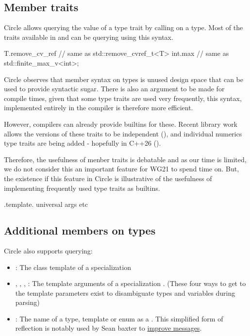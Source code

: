 \documentclass{wg21}
\begin{document}
\subsection{Member traits}
\label{sec:membertraits}

Circle allows querying the value of a type trait by calling \emph{} on a type.
Most of the traits available in  and  can be querying using this syntax.

\begin{colorblock}
T.remove_cv_ref  // same as std::remove_cvref_t<T>
int.max          // same as std::finite_max_v<int>;
\end{colorblock}

Circle observes that member syntax on types is unused design space that can be used to provide syntactic sugar.
There is also an argument to be made for compile times, given that some type traits are used very frequently,
this syntax, implemented entirely in the compiler is therefore more efficient.

However, compilers can already provide builtins for these.
Recent library work allows the  versions of these traits to be independent (),
and individual numerics type traits are being added - hopefully in C++26 ().

Therefore, the usefulness of menber traits is debatable and as our time is limited, we do not consider this an important feature
for WG21 to spend time on.
But, the existence if this feature in Circle is illustrative of the usefulness of implementing frequently used type traits as builtins.


.template.
universal args
etc

\subsection{Additional members on types}

Circle also supports querying:

\begin{itemize}
\item {} : The class template of a specialization 
\item {}, , ,  : The template arguments of a specialization .
      (These four ways to get to the template parameters exist to disambiguate types and variables during parsing)
\item {}: The name of a type, template or enum as a . This simplified form of reflection is notably used by Sean baxter to \hyperref[sec:static_assert_expr]{improve  messages}.
\end{itemize}
\end{document}

